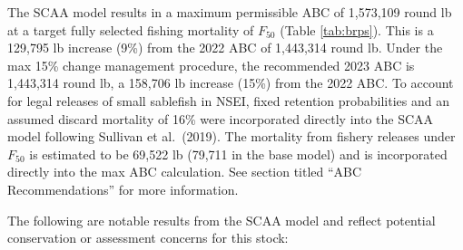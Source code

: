 \documentclass[
]{article}
\begin{document}
The SCAA model results in a maximum permissible ABC of 1,573,109 round lb at a target fully selected fishing mortality of \(F_{50}\) (Table \ref{tab:brps}). This is a 129,795 lb increase (9\%) from the 2022 ABC of 1,443,314 round lb. {Under the max 15\% change management procedure, the recommended 2023 ABC is 1,443,314 round lb, a 158,706 lb increase (15\%) from the 2022 ABC}. To account for legal releases of small sablefish in NSEI, fixed retention probabilities and an assumed discard mortality of 16\% were incorporated directly into the SCAA model following Sullivan et al.~(2019). The mortality from fishery releases under \(F_{50}\) is estimated to be 69,522 lb (79,711 in the base model) and is incorporated directly into the max ABC calculation. See section titled ``ABC Recommendations'' for more information.

The following are notable results from the SCAA model and reflect potential conservation or assessment concerns for this stock:
\end{document}
